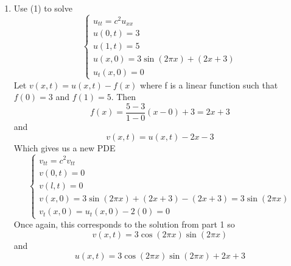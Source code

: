 \documentclass[12pt]{article}
\begin{document}
\begin{enumerate}
    \item Use (1) to solve 
    \[\begin{cases}
        u_{tt} = c^2u_{xx}\\
        u(0, t) = 3\\
        u(1, t) = 5\\
        u(x, 0) = 3\sin(2\pi x) + (2x + 3)\\
        u_t(x, 0) = 0
    \end{cases}\]
    \color{blue}
    Let $v(x, t) = u(x, t) - f(x)$ where f is a linear function such that $f(0) = 3$ and $f(1) = 5$. Then 
    \[f(x) = \frac{5 -3}{1 - 0}(x - 0) + 3 = 2x + 3\]
    and 
    \[v(x, t) = u(x, t) - 2x - 3\]
    Which gives us a new PDE
    \[\begin{cases}
        v_{tt} = c^2v_{tt}\\
        v(0, t) = 0\\
        v(l, t) = 0\\
        v(x, 0) = 3\sin(2\pi x) + (2x + 3) - (2x+3) = 3\sin(2\pi x)\\
        v_t(x, 0) = u_t(x, 0) - 2(0) = 0
    \end{cases}\]
    Once again, this corresponds to the solution from part 1 so 
    \[v(x, t) = 3\cos(2\pi x)\sin(2\pi x)\]
    and 
    \[\boxed{u(x, t) = 3\cos(2\pi x)\sin(2\pi x) + 2x + 3}\]
\end{enumerate}
\pagebreak
\end{document}
